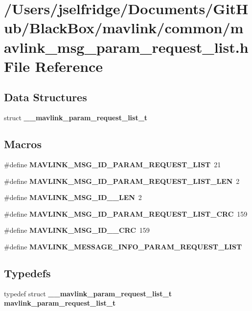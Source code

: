 \section{/\+Users/jselfridge/\+Documents/\+Git\+Hub/\+Black\+Box/mavlink/common/mavlink\+\_\+msg\+\_\+param\+\_\+request\+\_\+list.h File Reference}
\label{mavlink__msg__param__request__list_8h}
\subsection*{Data Structures}
\begin{DoxyCompactItemize}
\item 
struct \textbf{ \+\_\+\+\_\+mavlink\+\_\+param\+\_\+request\+\_\+list\+\_\+t}
\end{DoxyCompactItemize}
\subsection*{Macros}
\begin{DoxyCompactItemize}
\item 
\#define \textbf{ M\+A\+V\+L\+I\+N\+K\+\_\+\+M\+S\+G\+\_\+\+I\+D\+\_\+\+P\+A\+R\+A\+M\+\_\+\+R\+E\+Q\+U\+E\+S\+T\+\_\+\+L\+I\+ST}~21
\item 
\#define \textbf{ M\+A\+V\+L\+I\+N\+K\+\_\+\+M\+S\+G\+\_\+\+I\+D\+\_\+\+P\+A\+R\+A\+M\+\_\+\+R\+E\+Q\+U\+E\+S\+T\+\_\+\+L\+I\+S\+T\+\_\+\+L\+EN}~2
\item 
\#define \textbf{ M\+A\+V\+L\+I\+N\+K\+\_\+\+M\+S\+G\+\_\+\+I\+D\+\_\+\_\+\+L\+EN}~2
\item 
\#define \textbf{ M\+A\+V\+L\+I\+N\+K\+\_\+\+M\+S\+G\+\_\+\+I\+D\+\_\+\+P\+A\+R\+A\+M\+\_\+\+R\+E\+Q\+U\+E\+S\+T\+\_\+\+L\+I\+S\+T\+\_\+\+C\+RC}~159
\item 
\#define \textbf{ M\+A\+V\+L\+I\+N\+K\+\_\+\+M\+S\+G\+\_\+\+I\+D\+\_\+\_\+\+C\+RC}~159
\item 
\#define \textbf{ M\+A\+V\+L\+I\+N\+K\+\_\+\+M\+E\+S\+S\+A\+G\+E\+\_\+\+I\+N\+F\+O\+\_\+\+P\+A\+R\+A\+M\+\_\+\+R\+E\+Q\+U\+E\+S\+T\+\_\+\+L\+I\+ST}
\end{DoxyCompactItemize}
\subsection*{Typedefs}
\begin{DoxyCompactItemize}
\item 
typedef struct \textbf{ \+\_\+\+\_\+mavlink\+\_\+param\+\_\+request\+\_\+list\+\_\+t} \textbf{ mavlink\+\_\+param\+\_\+request\+\_\+list\+\_\+t}
\end{DoxyCompactItemize}


